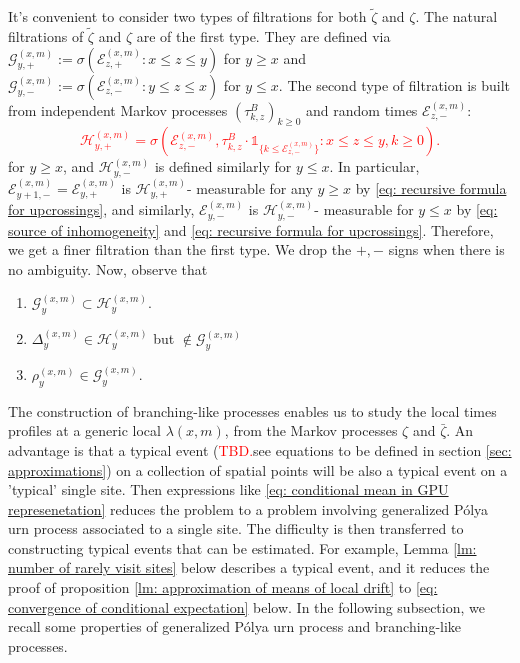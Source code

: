 \documentclass[twoside,12pt,a4paper]{article}
\numberwithin{equation}{section}
\newcommand\TBD{\textcolor{red}{TBD.}}
\newcommand{\edt}[1]{\textcolor{red}{#1}} %
\begin{document}
It's convenient to consider two types of filtrations for both $\tilde{\zeta}$ and $\zeta$. The natural filtrations of $\tilde{\zeta}$ and $\zeta$ are of the first type. They are defined via $\mathcal{G}_{y, +}^{(x,m)}:=\sigma\left(\mathcal{E}^{(x,m)}_{z, +}: x \le z \le y\right) $ for $y \ge x$ and $\mathcal{G}_{y, -}^{(x,m)}:=\sigma\left(\mathcal{E}^{(x,m)}_{z, -}: y \le z \le x\right) $ for $y \le x$.
The second type of filtration is built from independent Markov processes $\left(\tau_{k, z}^{B}\right)_{k\geq 0}$ and random times $ \mathcal{E}^{(x,m)}_{z, -}$:
\edt{
\[
	\mathcal{H}_{y, +}^{(x,m)} = \sigma\left( \mathcal{E}_{z, -}^{(x,m)}, \tau_{k, z}^{B}\cdot \mathbb{1}_{\{ k\leq \mathcal{E}_{z, -}^{(x,m)} \}} : x \leq  z \leq y,  k \geq 0 \right) 
.\] 
} 
for $y\geq x$, and $\mathcal{H}_{y, -}^{(x,m)}$ is defined similarly for $y\leq x$.
In particular, $\mathcal{E}_{y+1, -}^{(x,m)} = \mathcal{E}_{y, +}^{(x,m)}$ is  $\mathcal{H}_{y, +}^{(x,m)}$- measurable for any $y\geq x$ by \eqref{eq: recursive formula for upcrossings}, and similarly, $\mathcal{E}_{y, -}^{(x,m)}$ is $\mathcal{H}_{y, -}^{(x,m)}$- measurable for $ y\leq x$ by \eqref{eq: source of inhomogeneity} and \eqref{eq: recursive formula for upcrossings}. Therefore, we get a finer filtration than the first type.
 We drop the $+, -$ signs when there is no ambiguity. Now, observe that 
\begin{enumerate}
	\item 
$\mathcal{G}_y^{(x,m)} \subset \mathcal{H}_y^{(x,m)}.$ 
	\item $\Delta_y^{(x,m)} \in \mathcal{H}_y^{(x,m)}$ but $\not\in \mathcal{G}_y^{(x,m)}$
	\item $\rho_y^{(x,m)} \in \mathcal{G}_y^{(x,m)}$.
\end{enumerate}
		
		The construction of branching-like processes enables us to study the local times profiles at a generic local $\lambda(x,m)$, from the Markov processes $\zeta$ and $\bar{\zeta}$. An advantage is that a typical event (\TBD{see equations to be defined in section \ref{sec: approximations}}) on a collection of spatial points will be also a typical event on a 'typical' single site. Then expressions like \eqref{eq: conditional mean in GPU represenetation} reduces the problem to a problem involving generalized P\'{o}lya urn process associated to a single site. The difficulty is then transferred to constructing typical events that can be estimated. For example, Lemma \ref{lm: number of rarely visit sites} below describes a typical event, and it reduces the proof of proposition \ref{lm: approximation of means of local drift} to \eqref{eq: convergence of conditional expectation} below. In the following subsection, we recall some properties of generalized P\'{o}lya urn process and branching-like processes.
		
\end{document}
